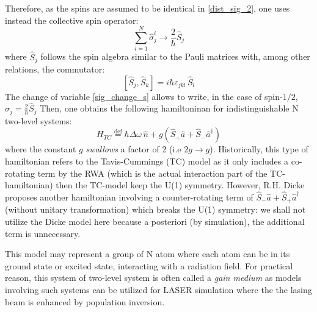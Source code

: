\documentclass[11pt]{report}
\begin{document}
Therefore, as the spins are assumed to be identical in \eqref{dist_sig_2}, one uses instead the collective spin operator:
\begin{equation}
\label{sig_change_s}
\sum_{i=1}^{N} \hat{\sigma}_j^i \rightarrow \frac{2}{\hbar} \hat{S}_j
\end{equation}
where $\hat{S}_j$ follows the spin algebra similar to the Pauli matrices with, among other relations, the commutator:
\begin{equation}
{\displaystyle [\hat{S} _{j},\hat{S} _{k}]=i\hbar\varepsilon _{jkl}\,\hat{S} _{l}}
\end{equation}
The change of variable \eqref{sig_change_s} allows to write, in the case of spin-$1/2$, $\hat{\sigma}_j = \frac{2}{\hbar}\hat{S}_j$ Then, one obtains the following hamiltoninan for indistinguishable N two-level systems:
\begin{equation}
H_{TC} \stackrel{\text{def}}{=} \hbar\Delta\omega\,\hat{n} + g \left(\hat{S}_+ \hat{a} + \hat{S}_-\hat{a}^{\dag} \right)
\end{equation}
where the constant $g$ \textit{swallows} a factor of 2 (i.e $2g \rightarrow g$). Historically, this type of hamiltonian refers to the Tavis-Cummings (TC) model as it only includes a co-rotating term by the RWA (which is the actual interaction part of the TC-hamiltonian) then the TC-model keep the U(1) symmetry. However, R.H. Dicke proposes another hamiltonian involving a counter-rotating term of $\hat{S}_- \hat{a} + \hat{S}_+\hat{a}^{\dag}$ (without unitary transformation) which breaks the U(1) symmetry: we shall not utilize the Dicke model here because a posteriori (by simulation), the additional term is unnecessary.

This model may represent a group of N atom where each atom can be in its ground state or excited state, interacting with a radiation field. For practical reason, this system of two-level system is often called a \textit{gain medium} as models involving such systems can be utilized for LASER simulation where the the lasing beam is enhanced by population inversion.
\end{document}
